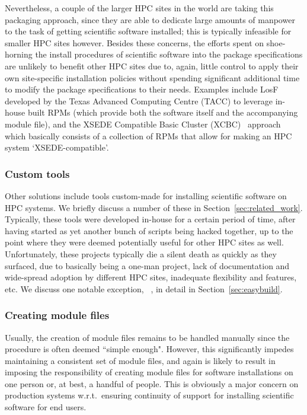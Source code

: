 Nevertheless, a couple of the larger HPC sites in the world are taking this
packaging approach, since they are able to dedicate large amounts of manpower to
the task of getting scientific software installed; this is typically infeasible for
smaller HPC sites however. Besides these concerns, the efforts spent on
shoe-horning the install procedures of scientific software into the package
specifications are unlikely to
benefit other HPC sites due to, again, little control to apply their own
site-specific installation policies without spending significant additional time to
modify the package specifications to their needs. Examples include
LosF~\cite{lmodSC11} developed by the Texas Advanced Computing Centre (TACC) to
leverage in-house built RPMs (which provide both the software itself
and the accompanying module file), and the XSEDE Compatible Basic Cluster
(XCBC)~\cite{Fischer14} approach which basically consists of a collection of RPMs that
allow for making an HPC system `XSEDE-compatible'.

\subsubsection{Custom tools}

Other solutions include tools custom-made for installing scientific software
on HPC systems. We briefly discuss a number of these in
Section~\ref{sec:related_work}. Typically, these tools were developed in-house for
a certain period of time, after having started as yet another bunch of
scripts being hacked together, up to the point where they were deemed potentially
useful for other HPC sites as well. Unfortunately, these projects typically die a
silent death as quickly as they surfaced, due to basically being a one-man project,
lack of documentation and wide-spread adoption by different HPC sites, inadequate
flexibility and features, etc. We discuss one notable
exception, \easybuild{}~\cite{EasyBuildSC12}, in detail in
Section~\ref{sec:easybuild}.

\subsubsection{Creating module files}

Usually, the creation of module files remains to be handled manually since the
procedure is often deemed ``simple enough". However, this significantly impedes
maintaining a consistent set of module files, and again is likely to result in
imposing the responsibility of creating module files for software installations
on one person or, at best, a handful of people. This is obviously a major concern
on production systems w.r.t.\ ensuring continuity of support for installing
scientific software for end users.

